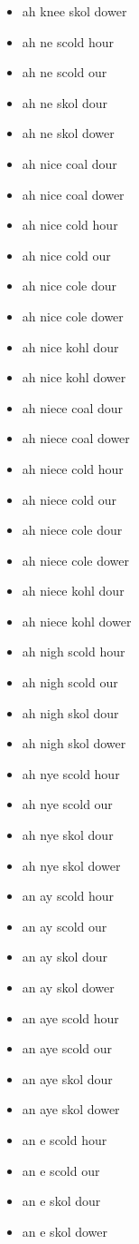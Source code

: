 \begin{itemize}
\item ah knee skol dower
\item ah ne scold hour
\item ah ne scold our
\item ah ne skol dour
\item ah ne skol dower
\item ah nice coal dour
\item ah nice coal dower
\item ah nice cold hour
\item ah nice cold our
\item ah nice cole dour
\item ah nice cole dower
\item ah nice kohl dour
\item ah nice kohl dower
\item ah niece coal dour
\item ah niece coal dower
\item ah niece cold hour
\item ah niece cold our
\item ah niece cole dour
\item ah niece cole dower
\item ah niece kohl dour
\item ah niece kohl dower
\item ah nigh scold hour
\item ah nigh scold our
\item ah nigh skol dour
\item ah nigh skol dower
\item ah nye scold hour
\item ah nye scold our
\item ah nye skol dour
\item ah nye skol dower
\item an ay scold hour
\item an ay scold our
\item an ay skol dour
\item an ay skol dower
\item an aye scold hour
\item an aye scold our
\item an aye skol dour
\item an aye skol dower
\item an e scold hour
\item an e scold our
\item an e skol dour
\item an e skol dower

\end{itemize}
